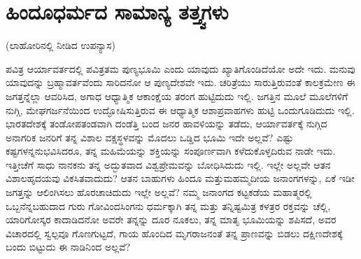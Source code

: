 
\chapter{ಹಿಂದೂಧರ್ಮದ ಸಾಮಾನ್ಯ ತತ್ತ್ವಗಳು}

\begin{center}
(ಲಾಹೋರಿನಲ್ಲಿ ನೀಡಿದ ಉಪನ್ಯಾಸ)
\end{center}

ಪವಿತ್ರ ಆರ್ಯಾವರ್ತದಲ್ಲಿ ಪವಿತ್ರತಮ ಪುಣ್ಯಭೂಮಿ ಎಂದು ಯಾವುದು ಖ್ಯಾತಿಗೊಂಡಿದೆಯೋ ಅದೇ ಇದು. ಮನುವು ಯಾವುದನ್ನು ಬ್ರಹ್ಮಾವರ್ತವೆಂದು ಸಾರಿದನೋ ಆ ಪುಣ್ಯದೇಶವೇ ಇದು. ಚರಿತ್ರೆಯು ಸಾರುತ್ತಿರುವಂತೆ ಕಾಲಕ್ರಮೇಣ ಈ ಜಗತ್ತನ್ನೆಲ್ಲಾ ಆವರಿಸಿದ, ಅಗಾಧ ಆಧ್ಯಾತ್ಮಿಕ ಆಕಾಂಕ್ಷೆಯ ತರಂಗ ಹುಟ್ಟಿದುದು ಇಲ್ಲಿ. ಜಗತ್ತಿನ ಮೂಲೆ ಮೂಲೆಗಳಿಗೆ ನುಗ್ಗಿ, ಮೇಘಗರ್ಜನೆಯಿಂದ ಉದ್ಘೋಷಿಸುತ್ತಿರುವ ಈ ಆಧ್ಯಾತ್ಮಿಕ ಆಶಾಪ್ರವಾಹಗಳು ಹುಟ್ಟಿ ಒಂದುಗೂಡಿದುದು ಇಲ್ಲಿ. ಭಾರತದೇಶಕ್ಕೆ ತಂಡೋಪತಂಡವಾಗಿ ದಂಡೆತ್ತಿ ಬಂದ ಜನರ ಹಾವಳಿಯನ್ನು ತಡೆದು, ಆರ್ಯಾವರ್ತಕ್ಕೆ ನುಗ್ಗಿದ ಅನಾಗರಿಕ ಜನರಿಗೆ ತನ್ನ ವಿಶಾಲ ವಕ್ಷಸ್ಥಳವನ್ನು ಮೊದಲು ಒಡ್ಡಿದ ಭೂಮಿ ಇದೇ ಅಲ್ಲವೆ? ಎಷ್ಟು ಕಷ್ಟಗಳನ್ನನುಭವಿಸಿದರೂ, ತನ್ನ ಮಹಿಮೆಯನ್ನು ಶಕ್ತಿಯನ್ನು ಸಂಪೂರ್ಣವಾಗಿ ಕಳೆದುಕೊಳ್ಳದಿರುವ ನಾಡೇ ಇದು. ಇತ್ತೀಚೆಗೆ ಸಾಧು ನಾನಕನು ತನ್ನ ಅದ್ಭುತವಾದ ವಿಶ್ವಪ್ರೇಮವನ್ನು ಬೋಧಿಸಿದುದು ಇಲ್ಲಿ. ಇಲ್ಲೇ ಅಲ್ಲವೇ ಆತನ ವಿಶಾಲ\break ಹೃದಯವು ವಿಕಸಿತವಾದುದು? ಆತನ ಬಾಹುಗಳು ಹಿಂದೂ ಮತ್ತು\break ಮಹಮ್ಮದೀಯ ಜನಾಂಗಗಳನ್ನು, ಏಕೆ ಇಡೀ ಜಗತ್ತನ್ನು ಆಲಿಂಗಿಸಲು ಹೊರಚಾಚಿದುದು ಇಲ್ಲೇ ಅಲ್ಲವೆ? ನಮ್ಮ ಜನಾಂಗದ ಕಟ್ಟಕಡೆಯ ಮಹಾತ್ಮರಲ್ಲಿ ಒಬ್ಬನೆನ್ನಬಹುದಾದ ಗುರು ಗೋವಿಂದಸಿಂಗನು ಧರ್ಮಕ್ಕಾಗಿ ತನ್ನ ಮತ್ತು ತನ್ನಿಷ್ಟಮಿತ್ರ ಕಳತ್ರರ ರಕ್ತವನ್ನು ಚೆಲ್ಲಿ, ಯಾರಿಗೋಸ್ಕರ ಕಾದಾಡಿದನೋ ಅವರೇ ತನ್ನನ್ನು ದೂರ ನೂಕಲು, ತನ್ನ ಮಾತೃ ಭೂಮಿಯನ್ನು ಶಪಿಸದೆ, ಅವರ ವಿಚಾರದಲ್ಲಿ ಸ್ವಲ್ಪವೂ ಗೊಣಗುಟ್ಟದೆ, ಗಾಯ ಹೊಂದಿದ ಮೃಗರಾಜನಂತೆ ತನ್ನ ಪ್ರಾಣವನ್ನು ಬಿಡಲು ದಕ್ಷಿಣದೇಶಕ್ಕೆ ಬಂದು ಬಿಟ್ಟುದು ಈ ನಾಡಿನಿಂದ ಅಲ್ಲವೆ?

